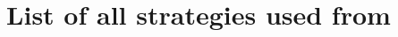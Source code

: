 \documentclass[a4paper]{article}
\title{List of all strategies used from \cite{Knight2018}}
\author{}
\date{}
\begin{document}
\maketitle


\begin{multicols}{2}
    \begin{enumerate}
        \scriptsize
        
    \end{enumerate}
\end{multicols}

\printbibliography
\end{document}
